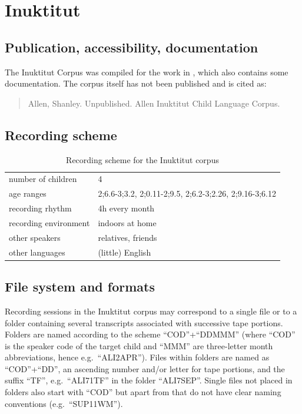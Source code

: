 \documentclass[a4paper, 11pt]{book}
\begin{document}
\section{Inuktitut}
\label{sec:Inuktitut}

\subsection{Publication, accessibility, documentation}
The Inuktitut Corpus \citep{Allen2015a} was compiled for the work in \citet{Allen1996a}, which also contains some documentation. The corpus itself has not been published and is cited as: 

\begin{quote}
	Allen, Shanley. Unpublished. Allen Inuktitut Child Language Corpus.
\end{quote}

\subsection{Recording scheme}

\begin{table}[ht]
	\centering
	\begin{tabular}{ll}
		\toprule
		number of children 	& 4 \\
		age ranges 			& 2;6.6-3;3.2, 2;0.11-2;9.5, 2;6.2-3;2.26, 2;9.16-3;6.12 \\
		recording rhythm 	& 4h every month \\
		recording environment & indoors at home \\
		other speakers 		& relatives, friends \\
		other languages		& (little) English \\
		\bottomrule
	\end{tabular}
	\caption{Recording scheme for the Inuktitut corpus}
	\label{tab:Inuktitut recording scheme}
\end{table}

\subsection{File system and formats}

Recording sessions in the Inuktitut corpus may correspond to a single file or to a folder containing several transcripts associated with successive tape portions. Folders are named according to the scheme “COD”+“DDMMM” (where “COD” is the speaker code of the target child and “MMM” are three-letter month abbreviations, hence e.g.\ “ALI2APR”). Files within folders are named as “COD”+“DD”, an ascending number and/or letter for tape portions, and the suffix “TF”, e.g.\ “ALI71TF” in the folder “ALI7SEP”. Single files not placed in folders also start with “COD” but apart from that do not have clear naming conventions (e.g.\ “SUP11WM”). 
\end{document}
